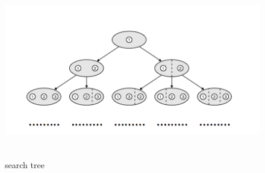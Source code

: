 \documentclass[a4paper,11pt,oneside]{book}
\begin{document}
\begin{figure}[ht!]
\centering
\includegraphics[width = 130mm, height = 76mm]{search_tree.png}
\caption{search tree}
\label{search_tree}
\end{figure}
\end{document}
